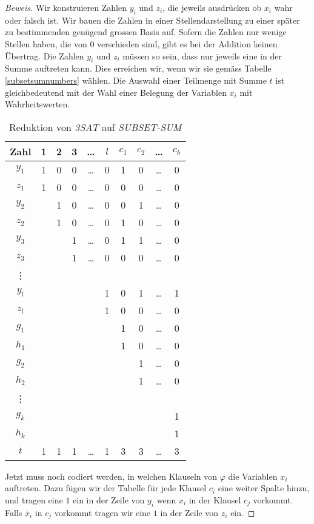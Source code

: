 \begin{proof}[Beweis]
Wir konstruieren Zahlen $y_i$ und $z_i$, die jeweils ausdrücken
ob $x_i$ wahr oder falsch ist.
Wir bauen die Zahlen in einer
Stellendarstellung zu einer später zu bestimmenden genügend
grossen Basis auf.
Sofern die Zahlen nur wenige Stellen haben, die 
von $0$ verschieden sind, gibt es bei der Addition keinen Übertrag.
Die Zahlen $y_i$ und $z_i$ müssen so sein, dass nur jeweils eine
in der Summe auftreten kann.
Dies erreichen wir, wenn wir
sie gemäss Tabelle \ref{subsetsumnumbers} wählen.
Die Auswahl einer Teilmenge mit Summe $t$ ist gleichbedeutend
mit der Wahl einer Belegung der Variablen $x_i$ mit Wahrheitswerten.
\begin{table}
\begin{center}
\begin{tabular}{|c|ccccc|cccc|}
\hline
Zahl&1&2&3&\dots&$l$&$c_1$&$c_2$&\dots&$c_k$\\
\hline
$y_1$&1&0&0&\dots&0&1&0&\dots&0\\
$z_1$&1&0&0&\dots&0&0&0&\dots&0\\
$y_2$& &1&0&\dots&0&0&1&\dots&0\\
$z_2$& &1&0&\dots&0&1&0&\dots&0\\
$y_3$& & &1&\dots&0&1&1&\dots&0\\
$z_3$& & &1&\dots&0&0&0&\dots&0\\
\vdots&& & &     & & & &     & \\
$y_l$& & & &     &1&0&1&\dots&1\\
$z_l$& & & &     &1&0&0&\dots&0\\
\hline
$g_1$& & & &     & &1&0&\dots&0\\
$h_1$& & & &     & &1&0&\dots&0\\
$g_2$& & & &     & & &1&\dots&0\\
$h_2$& & & &     & & &1&\dots&0\\
\vdots&& & &     & & & &     & \\
$g_k$& & & &     & & & &     &1\\
$h_k$& & & &     & & & &     &1\\
\hline
$t$  &1&1&1&\dots&1&3&3&\dots&3\\
\hline
\end{tabular}
\end{center}
\caption{Reduktion von \textsl{3SAT} auf
\textsl{SUBSET-SUM}\label{subsetsumtable}}
\end{table}

Jetzt muss noch codiert werden, in welchen Klauseln von $\varphi$ 
die Variablen $x_i$ auftreten.
Dazu fügen wir der Tabelle für jede
Klausel $c_i$ eine weiter Spalte hinzu, und tragen eine $1$ ein
in der Zeile von $y_i$ wenn $x_i$ in der Klausel $c_j$ vorkommt.
Falls $\bar x_i$ in $c_j$ vorkommt tragen wir eine $1$ in der Zeile
von $z_i$ ein.


\end{proof}

